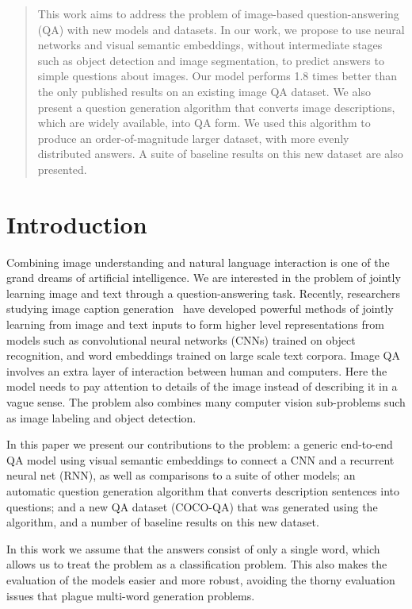 \begin{abstract}
This work aims to address the problem of image-based question-answering (QA)
with new models and datasets. In our work, we propose to use neural networks
and visual semantic embeddings, without intermediate stages such as object
detection and image segmentation, to predict answers to simple questions about
images. Our model performs 1.8 times better than the only published results on
an existing image QA dataset. We also present a question generation algorithm
that converts image descriptions, which are widely available, into QA form. We
used this algorithm to produce an order-of-magnitude larger dataset, with more
evenly distributed answers. A suite of baseline results on this new dataset are
also presented.
\end{abstract}

\section{Introduction}
Combining image understanding and natural language interaction is one of the
grand dreams of artificial intelligence. We are interested in the problem of
jointly learning image and text through a question-answering task. Recently,
researchers studying image caption generation~\cite{vinyals14,kiros14b,
karpathy14,mao14,donahue14,chen14,fang14,xu15,lebret15,klein15} have developed
powerful methods of jointly learning from image and text inputs to form higher
level representations from models such as convolutional neural networks (CNNs)
trained on object recognition, and word embeddings trained on large scale text
corpora. Image QA involves an extra layer of interaction between human and
computers. Here the model needs to pay attention to details of the image
instead of describing it in a vague sense. The problem also combines many
computer vision sub-problems such as image labeling and object detection.

In this paper we present our contributions to the problem: a generic end-to-end
QA model using visual semantic embeddings to connect a CNN and a recurrent
neural net (RNN), as well as comparisons to a suite of other models; an
automatic question generation algorithm that converts description sentences
into questions; and a new QA dataset (COCO-QA) that was generated using the
algorithm, and a number of baseline results on this new dataset.

In this work we assume that the answers consist of only a single word,
which allows us to treat the problem as a classification problem. This also
makes the evaluation of the models easier and more robust, avoiding the thorny
evaluation issues that plague multi-word generation problems.

